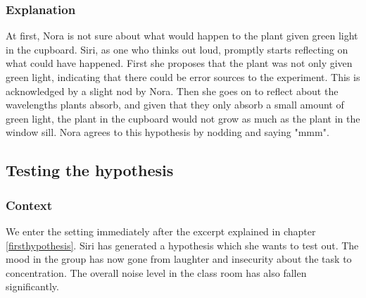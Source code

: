 \subsubsection*{Explanation}
At first, Nora is not sure about what would happen to the plant given green light in the cupboard. Siri, as one who thinks out loud, promptly starts reflecting on what could have happened. First she proposes that the plant was not only given green light, indicating that there could be error sources to the experiment. This is acknowledged by a slight nod by Nora. Then she goes on to reflect about the wavelengths plants absorb, and given that they only absorb a small amount of green light, the plant in the cupboard would not grow as much as the plant in the window sill. Nora agrees to this hypothesis by nodding and saying "mmm". 

\subsection{Testing the hypothesis}

\subsubsection*{Context}
We enter the setting immediately after the excerpt explained in chapter \ref{firsthypothesis}. Siri has generated a hypothesis which she wants to test out. The mood in the group has now gone from laughter and insecurity about the task to concentration. The overall noise level in the class room has also fallen significantly. 

